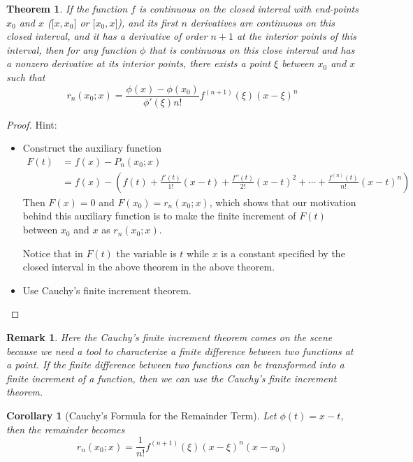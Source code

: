 \documentclass[onecolumn]{ctexart}
\newtheorem{theorem}{Theorem}
\newtheorem{corollary}{Corollary}
\newtheorem{remark}{Remark}
\begin{document}
\begin{theorem}
  If the function $f$ is continuous on the closed interval with end-points $x_0$ 
  and $x$ ($\lbrack x, x_0 \rbrack$ or $\lbrack x_0, x \rbrack$), and its first 
  $n$ derivatives are continuous on this closed interval, and it has a derivative 
  of order $n+1$ at the interior points of this interval, then for any function 
  $\phi$ that is continuous on this close interval and has a nonzero derivative 
  at its interior points, there exists a point $\xi$ between $x_0$ and $x$ such 
  that
  \begin{equation}
    r_n(x_0; x) = \frac{\phi(x) - \phi(x_0)}{\phi'(\xi)n!}f^{(n+1)}(\xi)(x - \xi)^n
  \end{equation}
\end{theorem}
\begin{proof}
  Hint:
  \begin{itemize}
    \item Construct the auxiliary function 
    \[
      \begin{split}
        F(t) &= f(x) - P_n(x_0; x) \\
             &= f(x) - (f(t) + \frac{f'(t)}{1!}(x - t) + \frac{f''(t)}{2!}(x - t)^2 + \cdots + \frac{f^{(n)}(t)}{n!}(x - t)^n)
      \end{split}
    \]
    Then $F(x) = 0$ and $F(x_0) = r_n(x_0;x)$, which shows that our motivation 
    behind this auxiliary function is to make the finite increment of $F(t)$ 
    between $x_0$ and $x$ as $r_n(x_0;x)$.

    Notice that in $F(t)$ the variable is $t$ while $x$ is a constant specified 
    by the closed interval in the above theorem in the above theorem.
    \item Use Cauchy's finite increment theorem.
  \end{itemize}
\end{proof}
\begin{remark}
  Here the Cauchy's finite increment theorem comes on the scene because we need 
  a tool to characterize a finite difference between two functions at a point. 
  If the finite difference between two functions can be transformed into a 
  finite increment of a function, then we can use the Cauchy's finite increment 
  theorem.
\end{remark}

\begin{corollary}[Cauchy's Formula for the Remainder Term]
  Let $\phi(t) = x - t$, then the remainder becomes
  \begin{equation}
    r_n(x_0; x) = \frac{1}{n!}f^{(n+1)}(\xi)(x - \xi)^n(x - x_0)
  \end{equation}
\end{corollary}
\end{document}

